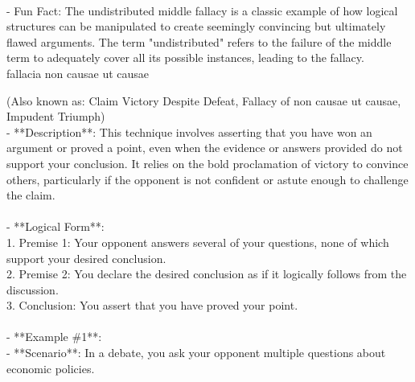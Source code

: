 \documentclass[a4paper,12pt,single,pdftex]{scrartcl}
\begin{document}
    
      
    \\

    
      - Fun Fact: The undistributed middle fallacy is a classic example of how logical structures can be manipulated to create seemingly convincing but ultimately flawed arguments. The term "undistributed" refers to the failure of the middle term to adequately cover all its possible instances, leading to the fallacy.
    \\

  

fallacia non causae ut causae
    
      (Also known as: Claim Victory Despite Defeat, Fallacy of non causae ut causae, Impudent Triumph)
    \\

  
    
      - **Description**: This technique involves asserting that you have won an argument or proved a point, even when the evidence or answers provided do not support your conclusion. It relies on the bold proclamation of victory to convince others, particularly if the opponent is not confident or astute enough to challenge the claim.
    \\

    
      
    \\

    
      - **Logical Form**:
    \\

    
        1. Premise 1: Your opponent answers several of your questions, none of which support your desired conclusion.
    \\

    
        2. Premise 2: You declare the desired conclusion as if it logically follows from the discussion.
    \\

    
        3. Conclusion: You assert that you have proved your point.
    \\

    
      
    \\

    
      - **Example \#1**:
    \\

    
        - **Scenario**: In a debate, you ask your opponent multiple questions about economic policies.
    \\
\end{document}
